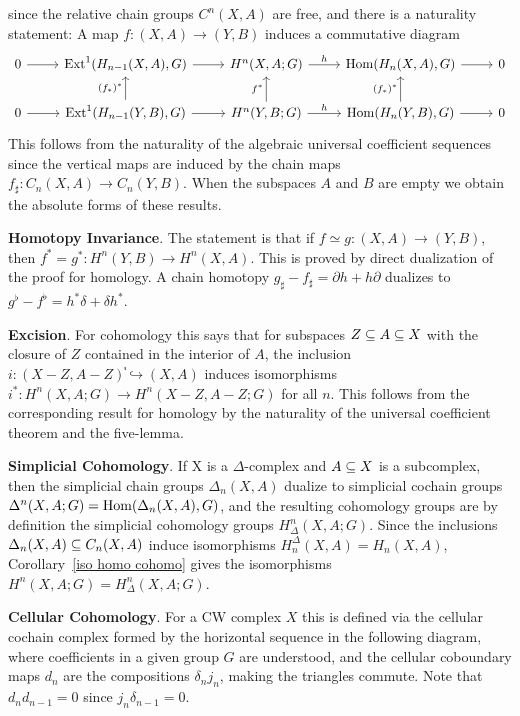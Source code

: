 since the relative chain groups $C^n(X,A)$ are free, and there is a naturality statement: A map $f:(X,A)\to(Y,B)$ induces a commutative diagram
\[\begin{tikzcd}
0\ar[r]&\Ext^1(H_{n-1}(X,A),G)\ar[r]&H^n(X,A;G)\ar[r,"h"]&\Hom(H_n(X,A),G)\ar[r]&0\\
0\ar[r]&\Ext^1(H_{n-1}(Y,B),G)\ar[u,"(f_*)^*"]\ar[r]&H^n(Y,B;G)\ar[u,"f^*"]\ar[r,"h"]&\Hom(H_n(Y,B),G)\ar[u,"(f_*)^*"]\ar[r]&0
\end{tikzcd}\]
This follows from the naturality of the algebraic universal coefficient sequences since the vertical maps are induced by the chain maps $f_\sharp:C_n(X,A)\to C_n(Y,B)$. When the subspaces $A$ and $B$ are empty we obtain the absolute forms of these results.\par
\textbf{Homotopy Invariance}. The statement is that if $f\simeq g:(X,A)\to (Y,B)$, then $f^*=g^*:H^n(Y,B)\to H^n(X,A)$. This is proved by direct dualization of the proof for homology. A chain homotopy $g_\sharp-f_\sharp=\partial h+h\partial$ dualizes to $g^\flat-f^\flat=h^*\delta+\delta h^*$.\par
\textbf{Excision}. For cohomology this says that for subspaces $Z\subseteq A\subseteq X$ with the closure of $Z$ contained in the interior of $A$, the inclusion $i:(X-Z,A-Z)֓\hookrightarrow(X,A)$ induces isomorphisms $i^*:H^n(X,A;G)\to H^n(X-Z,A-Z;G)$ for all $n$. This follows from the corresponding result for homology by the naturality of the universal coefficient theorem and the five-lemma.\par
\textbf{Simplicial Cohomology}. If X is a $\Delta$-complex and $A\subseteq X$ is a subcomplex, then the simplicial chain groups $\Delta_n(X,A)$ dualize to simplicial cochain groups $\Delta^n(X,A;G)=\mathrm{Hom}(\Delta_n(X,A),G)$, and the resulting cohomology groups are by definition the simplicial cohomology groups $H^n_\Delta(X,A;G)$. Since the inclusions $\Delta_n(X,A)\subseteq C_n(X,A)$ induce isomorphisms $H_n^\Delta(X,A)=H_n(X,A)$, Corollary~\ref{iso homo cohomo} gives the isomorphisms $H^n(X,A;G)=H^n_\Delta(X,A;G)$.\par
\textbf{Cellular Cohomology}. For a CW complex $X$ this is defined via the cellular cochain complex formed by the horizontal sequence in the following diagram, where coefficients in a given group $G$ are understood, and the cellular coboundary maps $d_n$ are the compositions $\delta_nj_n$, making the triangles commute. Note that $d_nd_{n-1}=0$ since
$j_n\delta_{n-1}=0$. 
